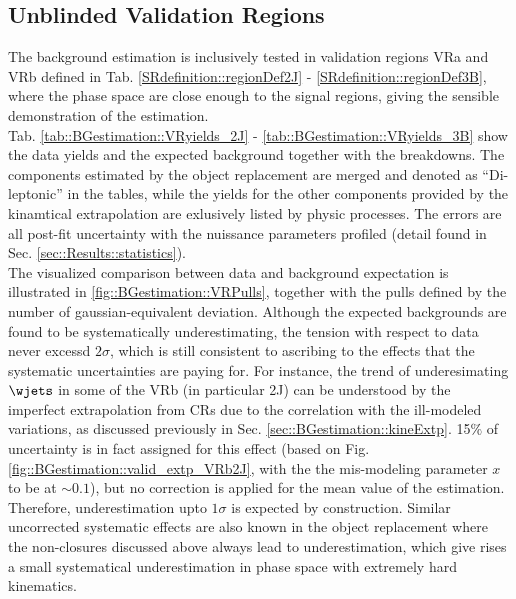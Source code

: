 \clearpage
\subsection{Unblinded Validation Regions}
The background estimation is inclusively tested in validation regions VRa and VRb defined in Tab. \ref{SRdefinition::regionDef2J} - \ref{SRdefinition::regionDef3B},
where the phase space are close enough to the signal regions, giving the sensible demonstration of the estimation. \\

Tab. \ref{tab::BGestimation::VRyields_2J} - \ref{tab::BGestimation::VRyields_3B} show the data yields and the expected background together with the breakdowns. 
The components estimated by the object replacement are merged and denoted as ``Di-leptonic'' in the tables, 
while the yields for the other components provided by the kinamtical extrapolation are exlusively listed by physic processes. 
The errors are all post-fit uncertainty with the nuissance parameters profiled (detail found in Sec. \ref{sec::Results::statistics}). \\

The visualized comparison between data and background expectation is illustrated in \ref{fig::BGestimation::VRPulls}, together with the pulls defined by the number of gaussian-equivalent deviation. 
Although the expected backgrounds are found to be systematically underestimating, the tension with respect to data never excessd $2\sigma$, which is still consistent to ascribing to the effects that the systematic uncertainties are paying for.
For instance, the trend of underesimating $\wjets$ in some of the VRb (in particular 2J) can be understood by the imperfect extrapolation from CRs due to the correlation with the ill-modeled variations, as discussed previously in Sec. \ref{sec::BGestimation::kineExtp}. 15$\%$ of uncertainty is in fact assigned for this effect (based on Fig. \ref{fig::BGestimation::valid_extp_VRb2J}, with the the mis-modeling parameter $x$ to be at $\sim0.1$), but no correction is applied for the mean value of the estimation. Therefore, underestimation upto $1\sigma$ is expected by construction. Similar uncorrected systematic effects are also known in the object replacement where the non-closures discussed above always lead to underestimation, which give rises a small systematical underestimation in phase space with extremely hard kinematics.


\clearpage


